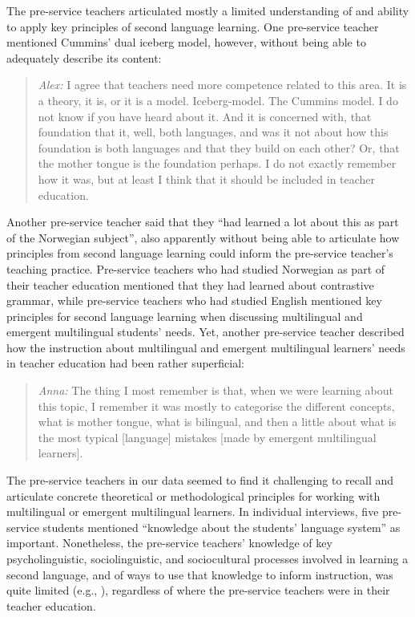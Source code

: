 \documentclass[output=paper]{langscibook}
\begin{document}
\begin{sloppypar}
The pre-service teachers articulated mostly a limited understanding of and ability to apply key principles of second language learning. One pre-service teacher mentioned Cummins’ dual iceberg model, however, without being able to adequately describe its content:
\end{sloppypar}

\begin{quote}
\emph{Alex:} I agree that teachers need more competence related to this area. It is a theory, it is, or it is a model. Iceberg-model. The Cummins model. I do not know if you have heard about it. And it is concerned with, that foundation that it, well, both languages, and was it not about how this foundation is both languages and that they build on each other? Or, that the mother tongue is the foundation perhaps. I do not exactly remember how it was, but at least I think that it should be included in teacher education.
\end{quote}

Another pre-service teacher said that they “had learned a lot about this as part of the Norwegian subject”, also apparently without being able to articulate how principles from second language learning could inform the pre-service teacher’s teaching practice. Pre-service teachers who had studied Norwegian as part of their teacher education mentioned that they had learned about contrastive grammar, while pre-service teachers who had studied English mentioned key principles for second language learning when discussing multilingual and emergent multilingual students’ needs. Yet, another pre-service teacher described how the instruction about multilingual and emergent multilingual learners’ needs in teacher education had been rather superficial:  

\begin{quote}
\emph{Anna:} The thing I most remember is that, when we were learning about this topic, I remember it was mostly to categorise the different concepts, what is mother tongue, what is bilingual, and then a little about what is the most typical [language] mistakes [made by emergent multilingual learners]. 
\end{quote}

The pre-service teachers in our data seemed to find it challenging to recall and articulate concrete theoretical or methodological principles for working with multilingual or emergent multilingual learners. In individual interviews, five pre-service students mentioned “knowledge about the students’ language system” as important. Nonetheless, the pre-service teachers’ knowledge of key psycholinguistic, sociolinguistic, and sociocultural processes involved in learning a second language, and of ways to use that knowledge to inform instruction, was quite limited (e.g., \citealt{LucasVillegas2013}), regardless of where the pre-service teachers were in their teacher education.
\end{document}
